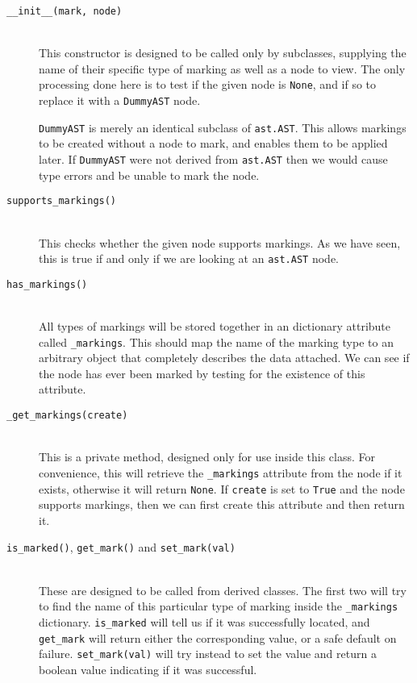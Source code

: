 \documentclass[twoside,a4paper]{report}
\begin{document}
\begin{description}
\item[\texttt{\_\_init\_\_(mark, node)}] \hfill \\
This constructor is designed to be called only by subclasses, supplying the name of their specific type of marking as well as a node to view. The only
processing done here is to test if the given node is \texttt{None}, and if so to replace it with a \texttt{DummyAST} node.

\texttt{DummyAST} is merely an identical subclass of \texttt{ast.AST}. This allows markings to be created without a node to mark,
and enables them to be applied later. If \texttt{DummyAST} were not derived from \texttt{ast.AST} then we would cause type errors and
be unable to mark the node.

\item[\texttt{supports\_markings()}] \hfill \\
This checks whether the given node supports markings. As we have seen, this is true if and only if we are looking at an \texttt{ast.AST}
node.

\item[\texttt{has\_markings()}] \hfill \\
All types of markings will be stored together in an dictionary attribute called \texttt{\_markings}. This should map the name of the marking
type to an arbitrary object that completely describes the data attached. We can see if the node has ever been marked by testing for the
existence of this attribute.

\item[\texttt{\_get\_markings(create)}] \hfill \\
This is a private method, designed only for use inside this class. For convenience, this will retrieve the \texttt{\_markings} attribute
from the node if it exists, otherwise it will return \texttt{None}. If \texttt{create} is set to \texttt{True} and the node supports
markings, then we can first create this attribute and then return it.

\item[\texttt{is\_marked()}, \texttt{get\_mark()} and \texttt{set\_mark(val)}] \hfill \\
These are designed to be called from derived classes. The first two will try to find the name of this particular type of marking inside
the \texttt{\_markings} dictionary. \texttt{is\_marked} will tell us if it was successfully located, and \texttt{get\_mark} will return either the
corresponding value, or a safe default on failure. \texttt{set\_mark(val)} will try instead to set the value and return a boolean value
indicating if it was successful.


\end{description}
\end{document}
